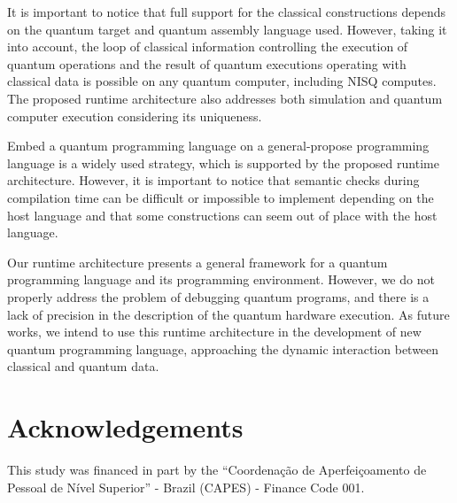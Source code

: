 \documentclass[preprint,3p,times,twocolumn]{elsarticle}
\begin{document}
It is important to notice that full support for the classical constructions
depends on the quantum target and quantum assembly language used.  However,
taking it into account, the loop of classical information controlling the
execution of quantum operations and the result of quantum executions operating
with classical data is possible on any quantum computer, including NISQ
computes. The proposed runtime architecture also addresses both simulation and
quantum computer execution considering its uniqueness.

Embed a quantum programming language on a general-propose programming language
is a widely used strategy, which is supported by the proposed runtime
architecture. However, it is important to notice that semantic checks during
compilation time can be difficult or impossible to implement depending on the
host language and that some constructions can seem out of place with the host
language.

Our runtime architecture presents a general framework for a quantum programming
language and its programming environment. However, we do not properly address
the problem of debugging quantum programs, and there is a lack of precision in
the description of the quantum hardware execution.  As future works, we intend
to use this runtime architecture in the development of new quantum programming
language, approaching the dynamic interaction between classical and quantum
data. 

\section{Acknowledgements}
This study was financed in part by the ``Coordenação de Aperfeiçoamento de
Pessoal de Nível Superior'' - Brazil (CAPES) -  Finance Code 001.



\end{document}

